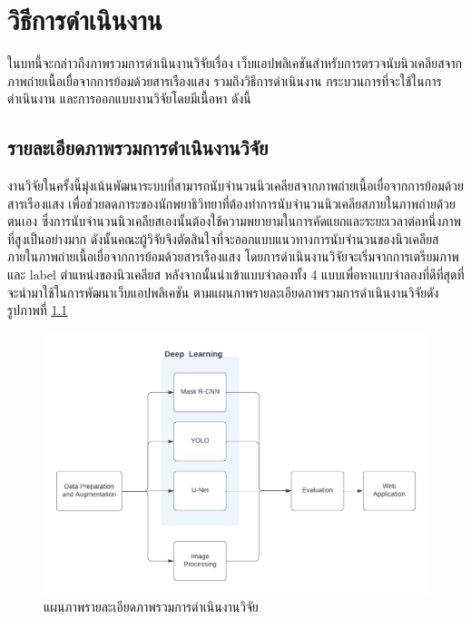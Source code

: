 \documentclass[12pt,oneside,openright,a4paper]{cpe-thai-project}
\begin{document}
\chapter{วิธีการดำเนินงาน}
ในบทนี้จะกล่าวถึงภาพรวมการดำเนินงานวิจัยเรื่อง เว็บแอปพลิเคชันสำหรับการตรวจนับนิวเคลียสจากภาพถ่ายเนื้อเยื่อจากการย้อมด้วยสารเรืองแสง รวมถึงวิธีการดำเนินงาน กระบวนการที่จะใช้ในการดำเนินงาน และการออกแบบงานวิจัยโดยมีเนื้อหา ดังนี้ 

\section{รายละเอียดภาพรวมการดำเนินงานวิจัย}
งานวิจัยในครั้งนี้มุ่งเน้นพัฒนาระบบที่สามารถนับจำนวนนิวเคลียสจากภาพถ่ายเนื้อเยื่อจากการย้อมด้วยสารเรืองแสง เพื่อช่วยลดภาระของนักพยาธิวิทยาที่ต้องทำการนับจำนวนนิวเคลียสภายในภาพถ่ายด้วยตนเอง ซึ่งการนับจำนวนนิวเคลียสเองนั้นต้องใช้ความพยายามในการคัดแยกและระยะเวลาต่อหนึ่งภาพที่สูงเป็นอย่างมาก ดังนั้นคณะผู้วิจัยจึงตัดสินใจที่จะออกแบบแนวทางการนับจำนวนของนิวเคลียสภายในภาพถ่ายเนื้อเยื่อจากการย้อมด้วยสารเรืองแสง โดยการดำเนินงานวิจัยจะเริ่มจากการเตรียมภาพและ label ตำแหน่งของนิวเคลียส หลังจากนั้นนำเข้าแบบจำลองทั้ง 4 แบบเพื่อหาแบบจำลองที่ดีที่สุดที่จะนำมาใช้ในการพัฒนาเว็บแอปพลิเคชัน ตามแผนภาพรายละเอียดภาพรวมการดำเนินงานวิจัยดังรูปภาพที่ \ref{fig:Flowchart3}

\begin{figure}[!h]
    \centering
    \includegraphics[scale=0.3]{images/Flowchart3.png}
    \caption{แผนภาพรายละเอียดภาพรวมการดำเนินงานวิจัย}
    \label{fig:Flowchart3}
\end{figure}
\end{document}
